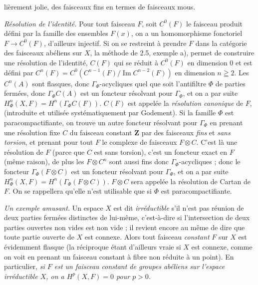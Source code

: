 
\noindent lièrement jolie, des faisceaux fins en termes de faisceaux mous.

\textit{Résolution de l'identité.} Pour tout faisceau $F$, soit $C^0(F)$ le
faisceau produit défini par la famille des ensembles $F(x)$, on a un
homomorphisme fonctoriel $F\to C^0(F)$, d'ailleurs injectif. Si
on se restreint à prendre $F$ dans la catégorie des faisceaux abéliens sur
$X$, la méthode de 2.5, exemple a), permet de construire une résolution de
l'identité, $C(F)$ qui se réduit à $C^0(F)$ en dimension 0 et est défini par
$C^n(F)=C^0(C^{n-1}(F)/\operatorname{Im}C^{n-2}(F))$
en dimension $n\geqq2$. Les $C^n(A)$ sont flasques, donc
$\Gamma_\Phi$-acycliques quel que soit l'antifiltre $\Phi$ de parties
fermées, donc $\Gamma_\Phi C(A)$ est un foncteur résolvant pour
$\Gamma_\Phi$, et on a par suite
$H^n_\Phi(X,F)=H^n(\Gamma_\Phi C(F))$.
$C(F)$ est appelée la \textit{résolution canonique} de $F$, (introduite et
utilisée systématiquement par Godement).
Si la famille $\Phi$ est paracompactifiante, on trouve un autre foncteur
résolvant pour $\Gamma_\Phi$ en prenant une résolution fixe $C$ du faisceau
constant $\mathbf Z$ par des faisceaux \textit{fins} et \textit{sans torsion}, et
prenant pour tout $F$ le complexe de faisceaux $F\otimes C$. C'est là une
résolution de $F$ (parce que $C$ est sans torsion), c'est un foncteur exact en
$F$ (même raison), de plus les $F\otimes C^n$ sont aussi fins donc
$\Gamma_\Phi$-acycliques ; donc le foncteur $\Gamma_\Phi(F\otimes C)$ est un
foncteur résolvant pour $\Gamma_\Phi$, et on a par suite
$H^n_\Phi(X,F)=H^n(\Gamma_\Phi(F\otimes C))$.
$F\otimes C$ sera appelée la résolution de Cartan de $F$. On se rappellera
qu'elle n'est utilisable que si $\Phi$ est paracompactifiante.

\textit{Un exemple amusant.} Un espace $X$ est dit \textit{irréductible} s'il
n'est pas réunion de deux parties fermées distinctes de lui-même, c'est-à-dire
si l'intersection de deux parties ouvertes non vides est non vide ; il revient
encore au même de dire que toute partie ouverte de $X$ est connexe. Alors tout
faisceau \textit{constant} $F$ sur $X$ est évidemment flasque (la réciproque
étant d'ailleurs vraie si $X$ est connexe, comme on voit en prenant un
faisceau constant à fibre non réduite à un point). En particulier, \textit{si
$F$ est un faisceau constant de groupes abéliens sur l'espace irréductible
$X$, on a $H^p(X,F)=0$ pour $p>0$.}

